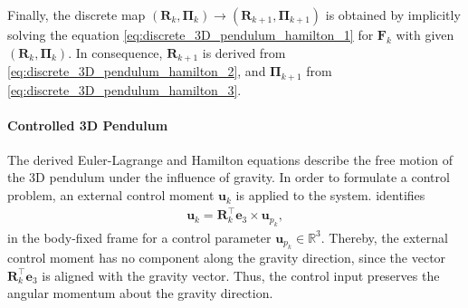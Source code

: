 Finally, the discrete map $(\bm{R}_k, \bm{\Pi}_k)  \to (\bm{R}_{k+1}, \bm{\Pi}_{k+1})$ is obtained by implicitly solving the equation \eqref{eq:discrete_3D_pendulum_hamilton_1} for $\bm{F}_k$ with given $(\bm{R}_k, \bm{\Pi}_k)$. In consequence, $\bm{R}_{k+1}$ is derived from \eqref{eq:discrete_3D_pendulum_hamilton_2}, and $\bm{\Pi}_{k+1}$ from \eqref{eq:discrete_3D_pendulum_hamilton_3}.

\paragraph{Controlled 3D Pendulum}

The derived Euler-Lagrange and Hamilton equations describe the free
motion of the 3D pendulum under the influence of gravity. In order to formulate a control problem,
an external control moment $\bm{u}_k$ is applied to the system. \cite{Lee2008} identifies 
\begin{align}\label{eq:external_control_moment_3D_pendulum}
    \bm{u}_k = \bm{R}_k^\top \bm{e}_3 \times \bm{u}_{p_{k}},
\end{align}
in the body-fixed frame for a control parameter $\bm{u}_{p_{k}} \in \mathbb{R}^3$. Thereby, the external control moment has no component
along the gravity direction, since the vector $\bm{R}_k^\top \bm{e}_3$ is aligned with the gravity vector. Thus, the
control input preserves the angular momentum about the gravity direction.

